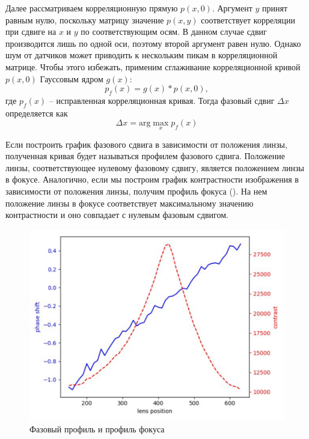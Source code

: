Далее рассматриваем корреляционную прямую $p(x,0)$. Аргумент $y$ принят равным нулю, поскольку матрицу значение $p(x,y)$ соответствует корреляции при сдвиге на $x$ и $y$ по соответствующим осям. В данном случае сдвиг производится лишь по одной оси, поэтому второй аргумент равен нулю. Однако шум от датчиков может приводить к нескольким пикам в корреляционной матрице. Чтобы этого избежать, применим сглаживание корреляционной кривой $p(x,0 )$ Гауссовым ядром $g(x)$:
\begin{equation}
	p_f(x) = g(x) * p(x, 0),
\end{equation}
где $p_f(x)$ -- исправленная корреляционная кривая. Тогда фазовый сдвиг $\Delta x$ определяется как
\begin{equation}
	\Delta x = \text{arg} \max_x p_f(x)
\end{equation} 

Если построить график фазового сдвига в зависимости от положения линзы, полученная кривая будет называться профилем фазового сдвига. Положение линзы, соответствующее нулевому фазовому сдвигу, является положением линзы в фокусе. Аналогично, если мы построим график контрастности изображения в зависимости от положения линзы, получим профиль фокуса (). На нем положение линзы в фокусе соответствует максимальному значению контрастности и оно совпадает с нулевым фазовым сдвигом.

\begin{figure}[ht!] 
	\center
	\includegraphics [scale=0.7] {my_folder/images/phase_profile.png}
	\caption{Фазовый профиль и профиль фокуса}
	\label{fig:phse_profile}
\end{figure}

